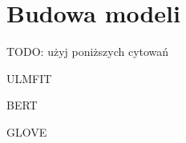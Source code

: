 \chapter{Budowa modeli}

TODO: użyj poniższych cytowań

\cite{howard2018universal} ULMFIT

\cite{devlin2018bert} BERT

\cite{brochier2019global} GLOVE